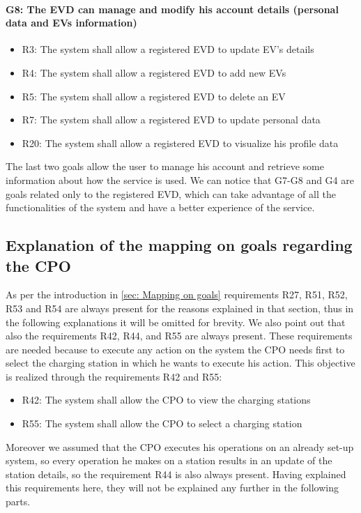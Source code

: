 \paragraph{G8: The EVD can manage and modify his account details (personal data and EVs information)}
\begin{itemize}
    \item R3: The system shall allow a registered EVD to update EV's details
    \item R4: The system shall allow a registered EVD to add new EVs
    \item R5: The system shall allow a registered EVD to delete an EV
    \item R7: The system shall allow a registered EVD to update personal data
    \item R20: The system shall allow a registered EVD to visualize his profile data
\end{itemize}
The last two goals allow the user to manage his account and retrieve some information about how the service is used. We can notice that G7-G8 and G4 are goals related only to the registered EVD, which can take advantage of all the functionalities of the system and have a better experience of the service.

\subsection{Explanation of the mapping on goals regarding the CPO}
As per the introduction in \ref{sec: Mapping on goals} requirements R27, R51, R52, R53 and R54 are always present for the reasons explained in that section, thus in the following explanations it will be omitted for brevity. We also point out that also the requirements R42, R44, and R55 are always present. These requirements are needed because to execute any action on the system the CPO needs first to select the charging station in which he wants to execute his action. This objective is realized through the requirements R42 and R55:
\begin{itemize}
    \item R42: The system shall allow the CPO to view the charging stations
    \item R55: The system shall allow the CPO to select a charging station
\end{itemize}
Moreover we assumed that the CPO executes his operations on an already set-up system, so every operation he makes on a station results in an update of the station details, so the requirement R44 is also always present. Having explained this requirements here, they will not be explained any further in the following parts.
